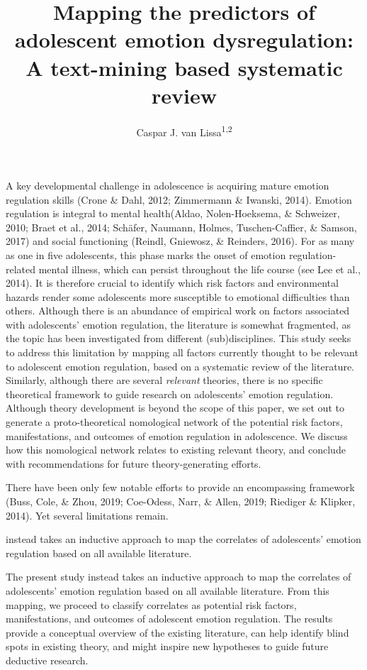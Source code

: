 \documentclass[
  english,
  man]{apa6}
\author{Caspar J. van Lissa\textsuperscript{1,2}}
\affiliation{
\vspace{0.5cm}
\textsuperscript{1} Utrecht University faculty of Social and Behavioral Sciences, department of Methodology \& Statistics\\\textsuperscript{2} Open Science Community Utrecht}
\title{Mapping the predictors of adolescent emotion dysregulation: A text-mining based systematic review}
\date{}
\begin{document}
\maketitle

A key developmental challenge in adolescence is acquiring mature emotion regulation skills (Crone \& Dahl, 2012; Zimmermann \& Iwanski, 2014). Emotion regulation is integral to mental health(Aldao, Nolen-Hoeksema, \& Schweizer, 2010; Braet et al., 2014; Schäfer, Naumann, Holmes, Tuschen-Caffier, \& Samson, 2017) and social functioning (Reindl, Gniewosz, \& Reinders, 2016). For as many as one in five adolescents, this phase marks the onset of emotion regulation-related mental illness, which can persist throughout the life course (see Lee et al., 2014). It is therefore crucial to identify which risk factors and environmental hazards render some adolescents more susceptible to emotional difficulties than others. Although there is an abundance of empirical work on factors associated with adolescents' emotion regulation, the literature is somewhat fragmented, as the topic has been investigated from different (sub)disciplines. This study seeks to address this limitation by mapping all factors currently thought to be relevant to adolescent emotion regulation, based on a systematic review of the literature. Similarly, although there are several \emph{relevant} theories, there is no specific theoretical framework to guide research on adolescents' emotion regulation. Although theory development is beyond the scope of this paper, we set out to generate a proto-theoretical nomological network of the potential risk factors, manifestations, and outcomes of emotion regulation in adolescence. We discuss how this nomological network relates to existing relevant theory, and conclude with recommendations for future theory-generating efforts.

There have been only few notable efforts to provide an encompassing framework (Buss, Cole, \& Zhou, 2019; Coe-Odess, Narr, \& Allen, 2019; Riediger \& Klipker, 2014). Yet several limitations remain.

instead takes an inductive approach to map the correlates of adolescents' emotion regulation based on all available literature.

The present study instead takes an inductive approach to map the correlates of adolescents' emotion regulation based on all available literature. From this mapping, we proceed to classify correlates as potential risk factors, manifestations, and outcomes of adolescent emotion regulation. The results provide a conceptual overview of the existing literature, can help identify blind spots in existing theory, and might inspire new hypotheses to guide future deductive research.
\end{document}

